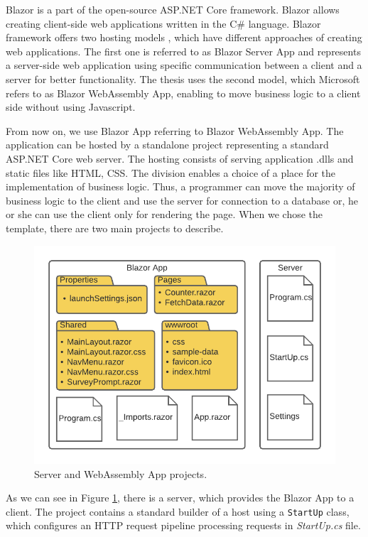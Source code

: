 Blazor is a part of the open-source ASP.NET Core framework.
Blazor allows creating client-side web applications written in the C\# language.
Blazor framework offers two hosting models \cite{online:hostingModels}, which have different approaches of creating web applications. 
The first one is referred to as Blazor Server App and represents a server-side web application using specific communication between a client and a server for better functionality.
The thesis uses the second model, which Microsoft refers to as Blazor WebAssembly App, enabling to move business logic to a client side without using Javascript.
\par
From now on, we use Blazor App referring to Blazor WebAssembly App.
The application can be hosted by a standalone project representing a standard ASP.NET Core web server.
The hosting consists of serving application .dlls and static files like HTML, CSS.
The division enables a choice of a place for the implementation of business logic.
Thus, a programmer can move the majority of business logic to the client and use the server for connection to a database or, he or she can use the client only for rendering the page.
When we chose the template, there are two main projects to describe.
\par
\begin{figure}\centering
\includegraphics{./img/ProjectStructure}
\caption{Server and WebAssembly App projects.}
\label{img04:projects}
\end{figure} 
\par
As we can see in Figure \ref{img04:projects}, there is a server, which provides the Blazor App to a client.
The project contains a standard builder of a host using a \texttt{StartUp} class, which configures an HTTP request pipeline processing requests in \textit{StartUp.cs} file.
